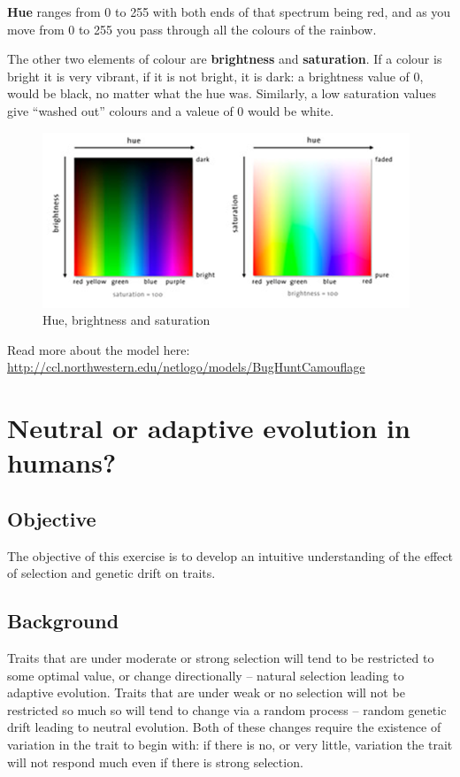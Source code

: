 \documentclass[
  a4paper]{book}
\begin{document}
\textbf{Hue} ranges from 0 to 255 with both ends of that spectrum being
red, and as you move from 0 to 255 you pass through all the colours of
the rainbow.

The other two elements of colour are \textbf{brightness} and
\textbf{saturation}. If a colour is bright it is very vibrant, if it is
not bright, it is dark: a brightness value of 0, would be black, no
matter what the hue was. Similarly, a low saturation values give
``washed out'' colours and a valeue of 0 would be white.

\begin{figure}

{\centering \includegraphics[width=0.5\linewidth]{images/colours} 

}

\caption{Hue, brightness and saturation}\label{fig:colours}
\end{figure}

Read more about the model here:
\url{http://ccl.northwestern.edu/netlogo/models/BugHuntCamouflage}

\hypertarget{neutral-or-adaptive-evolution-in-humans}{%
\chapter{Neutral or adaptive evolution in
humans?}\label{neutral-or-adaptive-evolution-in-humans}}

\hypertarget{objective}{%
\section{Objective}\label{objective}}

The objective of this exercise is to develop an intuitive understanding
of the effect of selection and genetic drift on traits.

\hypertarget{background}{%
\section{Background}\label{background}}

Traits that are under moderate or strong selection will tend to be
restricted to some optimal value, or change directionally -- natural
selection leading to adaptive evolution. Traits that are under weak or
no selection will not be restricted so much so will tend to change via a
random process -- random genetic drift leading to neutral evolution.
Both of these changes require the existence of variation in the trait to
begin with: if there is no, or very little, variation the trait will not
respond much even if there is strong selection.
\end{document}
